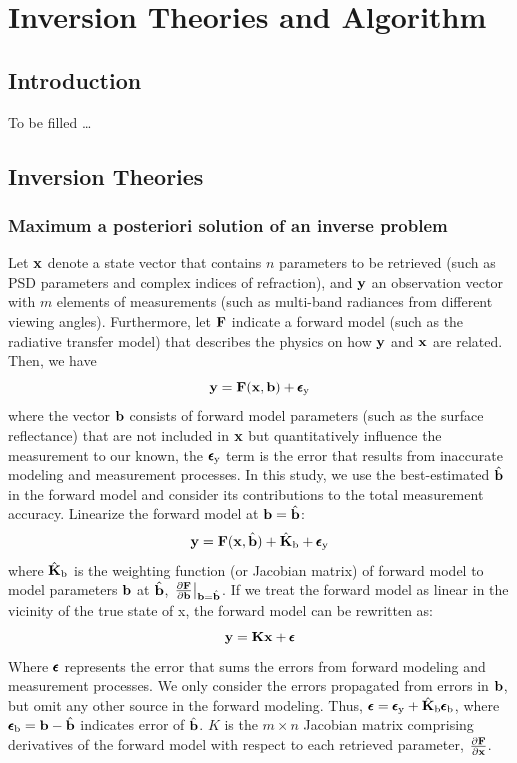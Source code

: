 \chapter{Inversion Theories and Algorithm} \label{ch:algorithm}

\section{Introduction}

To be filled \ldots

\section{Inversion Theories} \label{sec:invtheory}

\subsection{Maximum a posteriori solution of an inverse problem}

Let $\mathbf{x}$ denote a state vector that contains $n$ parameters to be retrieved
(such as PSD parameters and complex indices of refraction), and $\mathbf{y}$ an
observation vector with $m$ elements of measurements (such as multi-band
radiances from different viewing angles). Furthermore, let $\mathbf{F}$ indicate a
forward model (such as the radiative transfer model) that describes the
physics on how $\mathbf{y}$ and $\mathbf{x}$ are related. Then, we have
\begin{equation}
\mathbf{y} = \mathbf{F}(\mathbf{x},\mathbf{b}) + \pmb{\epsilon}_\text{y}
\end{equation}
where the vector $\mathbf{b}$ consists of forward model parameters (such as the
surface reflectance) that are not included in $\mathbf{x}$ but quantitatively
influence the measurement to our known, the $\pmb{\epsilon}_\text{y}$ term is the error that
results from inaccurate modeling and measurement processes. In this
study, we use the best-estimated $\hat{\mathbf{b}}$ in the forward model and consider
its contributions to the total measurement accuracy. Linearize the
forward model at $\mathbf{b}=\hat{\mathbf{b}}$:
\begin{equation}
\mathbf{y} = \mathbf{F}(\mathbf{x},\hat{\mathbf{b}})+\hat{\mathbf{K}}_\text{b}+\pmb{\epsilon}_\text{y}
\end{equation}
where $\hat{\mathbf{K}}_\text{b}$ is the weighting function (or Jacobian matrix) 
of forward model to model parameters $\mathbf{b}$ at $\hat{\mathbf{b}}$,
$\left.\frac{\partial\mathbf{F}}{\partial\mathbf{b}}\right|_{\mathbf{b}=\hat{\mathbf{b}}}$. 
If we treat the forward model as
linear in the vicinity of the true state of x, the forward model can be
rewritten as:
\begin{equation}
\mathbf{y} = \mathbf{K}\mathbf{x} + \pmb{\epsilon} \label{eq:mfx}
\end{equation}
Where $\pmb{\epsilon}$ represents the error that sums the errors from forward modeling
and measurement processes. We only consider the errors propagated from
errors in $\mathbf{b}$, but omit any other source in the forward modeling. Thus,
$\pmb{\epsilon}=\pmb{\epsilon}_\text{y}+\hat{\mathbf{K}}_\text{b}\pmb{\epsilon}_\text{b}$, where
$\pmb{\epsilon}_\text{b}=\mathbf{b}-\hat{\mathbf{b}}$ indicates error of $\hat{\mathbf{b}}$. $K$ is the
$m \times n$ Jacobian matrix comprising derivatives of the forward model
with respect to each retrieved parameter,
$\frac{\partial\mathbf{F}}{\partial\mathbf{x}}$. 

